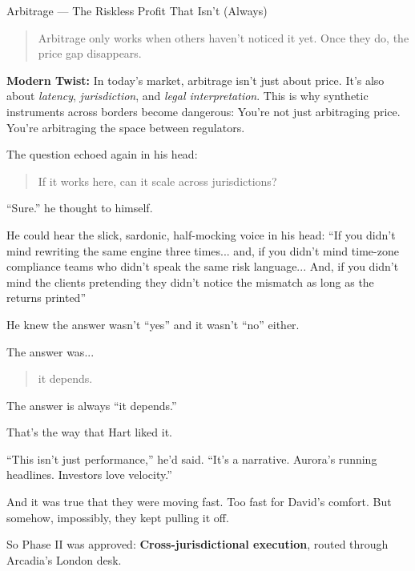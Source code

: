 \begin{TechnicalSidebar}{Arbitrage --- The Riskless Profit That Isn’t (Always)}
    \begin{quote}
      Arbitrage only works when others haven't noticed it yet. Once they do, the price gap disappears.
    \end{quote}
    
    \textbf{Modern Twist:}  
    In today’s market, arbitrage isn't just about price. It's also about \textit{latency}, 
    \textit{jurisdiction}, and \textit{legal interpretation}.  
    This is why synthetic instruments across borders become dangerous:  
    You're not just arbitraging price.  
    You're arbitraging the space between regulators.
    
\end{TechnicalSidebar}

\medskip

The question echoed again in his head:

\begin{quote}
    If it works here, can it scale across jurisdictions?
\end{quote}

``Sure.'' he thought to himself. 

He could hear the slick, sardonic, half-mocking voice in his head: ``If you didn’t mind rewriting 
the same engine three times... and,
if you didn’t mind time-zone compliance teams who didn’t speak the same risk language...
And, if you didn’t mind the clients pretending they didn’t notice the mismatch as long 
as the returns printed''

He knew the answer wasn’t ``yes'' and it wasn’t ``no'' either.

The answer was... 
\begin{quote}
    \centering
    it depends.
\end{quote}

The answer is always ``it depends.''

That's the way that Hart liked it.

``This isn’t just performance,'' he’d said. ``It’s a narrative. Aurora’s running headlines. Investors love 
velocity.''

And it was true that they were moving fast.
Too fast for David’s comfort.
But somehow, impossibly, they kept pulling it off.

So Phase II was approved:
\textbf{Cross-jurisdictional execution}, routed through Arcadia’s London desk.

\medskip

